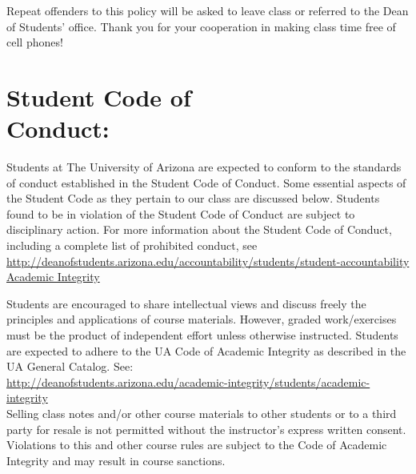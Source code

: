 \documentclass[11pt]{article}
\begin{document}
\hangindent=5cm 
Repeat offenders to this policy will be asked to leave class or referred to the Dean of Students' office.
Thank you for your cooperation in making class time free of cell phones!

\vspace{0.5cm}


\section{\textbf{Student Code of\\ Conduct:}}
\vspace{-1.3cm}
\hangindent=5cm 
Students at The University of Arizona are expected to conform to the standards of conduct established in the Student Code of Conduct.  
Some essential aspects of the Student Code as they pertain to our class are discussed below.
Students found to be in violation of the Student Code of Conduct are subject to disciplinary action.  For more information about the Student Code of Conduct, including a complete list of prohibited conduct, see\\ \href{http://deanofstudents.arizona.edu/accountability/students/student-accountability}{http://deanofstudents.arizona.edu/accountability/students/student-accountability}\\

\hangindent=5cm 
\underline{Academic Integrity}

\hangindent=5cm 
Students are encouraged to share intellectual views and discuss freely the principles and applications of course materials. 
However, graded work/exercises must be the product of independent effort unless otherwise instructed. 
Students are expected to adhere to the UA Code of Academic Integrity as described in the UA General Catalog. See:\\  
\href{http://deanofstudents.arizona.edu/academic-integrity/students/academic-integrity}{http://deanofstudents.arizona.edu/academic-integrity/students/academic-integrity}\\

\hangindent=5cm 
Selling class notes and/or other course materials to other students or to a third party for resale is not permitted without the instructor's express written consent. Violations to this and other course rules are subject to the Code of Academic Integrity and may result in course sanctions.\\ 
\end{document}
